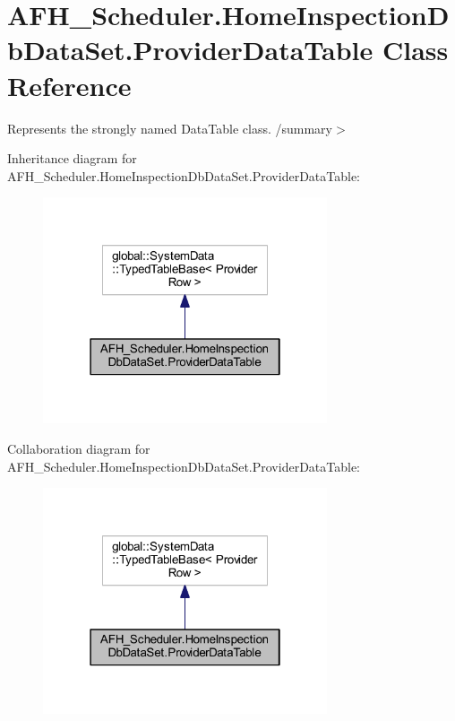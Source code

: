 \section{A\+F\+H\+\_\+\+Scheduler.\+Home\+Inspection\+Db\+Data\+Set.\+Provider\+Data\+Table Class Reference}
\label{class_a_f_h___scheduler_1_1_home_inspection_db_data_set_1_1_provider_data_table}


Represents the strongly named Data\+Table class. /summary$>$  




Inheritance diagram for A\+F\+H\+\_\+\+Scheduler.\+Home\+Inspection\+Db\+Data\+Set.\+Provider\+Data\+Table\+:
\nopagebreak
\begin{figure}[H]
\begin{center}
\leavevmode
\includegraphics[width=238pt]{class_a_f_h___scheduler_1_1_home_inspection_db_data_set_1_1_provider_data_table__inherit__graph}
\end{center}
\end{figure}


Collaboration diagram for A\+F\+H\+\_\+\+Scheduler.\+Home\+Inspection\+Db\+Data\+Set.\+Provider\+Data\+Table\+:
\nopagebreak
\begin{figure}[H]
\begin{center}
\leavevmode
\includegraphics[width=238pt]{class_a_f_h___scheduler_1_1_home_inspection_db_data_set_1_1_provider_data_table__coll__graph}
\end{center}
\end{figure}
